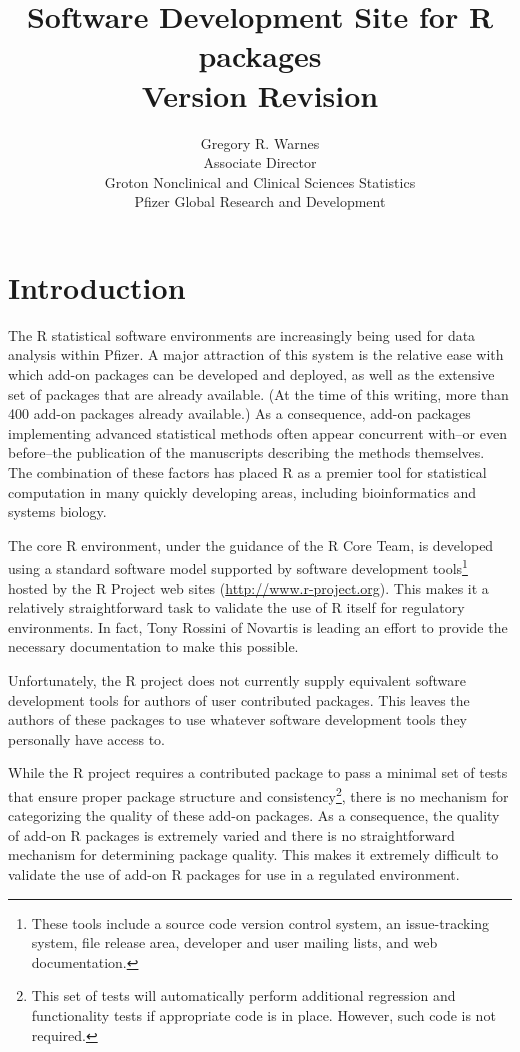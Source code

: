 \documentclass[12pt]{article}
\title{Software Development Site for R packages\\
       Version $ $Revision$ $ }
\author{Gregory R. Warnes\\
  Associate Director\\
  Groton Nonclinical and Clinical Sciences Statistics\\
  Pfizer Global Research and Development}
\begin{document}
\maketitle

\section{Introduction}

The R statistical software environments are increasingly being used
for data analysis within Pfizer.  A major attraction of this system is
the relative ease with which add-on packages can be developed and
deployed, as well as the extensive set of packages that are already
available.  (At the time of this writing, more than 400 add-on
packages already available.)  As a consequence, add-on packages
implementing advanced statistical methods often appear concurrent
with--or even before--the publication of the manuscripts describing
the methods themselves.  The combination of these factors has placed R
as a premier tool for statistical computation in many quickly
developing areas, including bioinformatics and systems biology.

The core R environment, under the guidance of the R Core Team, is
developed using a standard software model supported by software
development tools\footnote{These tools include a source code version
  control system, an issue-tracking system, file release area,
  developer and user mailing lists, and web documentation.}  hosted by
the R Project web sites (\url{http://www.r-project.org}).  This makes it a
relatively straightforward task to validate the use of R itself
for regulatory environments.  In fact, Tony Rossini of Novartis is
leading an effort to provide the necessary documentation to make this
possible.

Unfortunately, the R project does not currently supply equivalent
software development tools for authors of user contributed packages.
This leaves the authors of these packages to use whatever software
development tools they personally have access to.

While the R project requires a contributed package to pass a minimal
set of tests that ensure proper package structure and
consistency\footnote{This set of tests will automatically perform
  additional regression and functionality tests if appropriate code is
  in place.  However, such code is not required.}, there is no
mechanism for categorizing the quality of these add-on packages.  As a
consequence, the quality of add-on R packages is extremely varied and
there is no straightforward mechanism for determining package quality.
This makes it extremely difficult to validate the use of add-on R
packages for use in a regulated environment.
\end{document}
